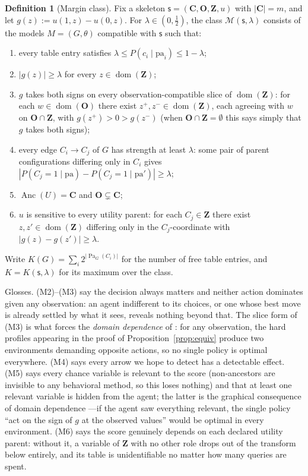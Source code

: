 \documentclass[11pt]{amsart}
\theoremstyle{plain}
\theoremstyle{definition}
\newtheorem{definition}[theorem]{Definition}
\DeclareMathOperator{\Anc}{Anc}
\DeclareMathOperator{\Pa}{Pa}
\DeclareMathOperator{\dom}{dom}
\newcommand{\bC}{\mathbf{C}}
\newcommand{\bO}{\mathbf{O}}
\newcommand{\bZ}{\mathbf{Z}}
\newcommand{\MM}{\mathcal{M}}
\newcommand{\sk}{\mathsf{s}}
\begin{document}
\begin{definition}[Margin class]\label{def:margin}
Fix a skeleton $\sk=(\bC,\bO,\bZ,u)$ with $|\bC|=m$, and let $g(z):=u(1,z)-u(0,z)$. For $\lambda\in(0,\tfrac12)$, the class $\MM(\sk,\lambda)$ consists of the models $M=(G,\theta)$ compatible with $\sk$ such that:
\begin{enumerate}
\item[(M1)] every table entry satisfies $\lambda\le P(c_i\mid\mathrm{pa}_i)\le 1-\lambda$;
\item[(M2)] $|g(z)|\ge\lambda$ for every $z\in\dom(\bZ)$;
\item[(M3)] $g$ takes both signs on every observation-compatible slice of $\dom(\bZ)$: for each $w\in\dom(\bO)$ there exist $z^+,z^-\in\dom(\bZ)$, each agreeing with $w$ on $\bO\cap\bZ$, with $g(z^+)>0>g(z^-)$ (when $\bO\cap\bZ=\emptyset$ this says simply that $g$ takes both signs);
\item[(M4)] every edge $C_i\to C_j$ of $G$ has strength at least $\lambda$: some pair of parent configurations differing only in $C_i$ gives $|P(C_j\!=\!1\mid\mathrm{pa})-P(C_j\!=\!1\mid\mathrm{pa}')|\ge\lambda$;
\item[(M5)] $\Anc(U)=\bC$ and $\bO\subsetneq\bC$;
\item[(M6)] $u$ is sensitive to every utility parent: for each $C_j\in\bZ$ there exist $z,z'\in\dom(\bZ)$ differing only in the $C_j$-coordinate with $|g(z)-g(z')|\ge\lambda$.
\end{enumerate}
Write $K(G)=\sum_i 2^{|\Pa_G(C_i)|}$ for the number of free table entries, and $K=K(\sk,\lambda)$ for its maximum over the class.
\end{definition}

Glosses. (M2)--(M3) say the decision always matters and neither action dominates given any observation: an agent indifferent to its choices, or one whose best move is already settled by what it sees, reveals nothing beyond that. The slice form of (M3) is what forces the \emph{domain dependence} of \cite{richens2024}: for any observation, the hard profiles appearing in the proof of Proposition~\ref{prop:equiv} produce two environments demanding opposite actions, so no single policy is optimal everywhere. (M4) says every arrow we hope to detect has a detectable effect. (M5) says every chance variable is relevant to the score (non-ancestors are invisible to any behavioral method, so this loses nothing) and that at least one relevant variable is hidden from the agent; the latter is the graphical consequence of domain dependence \cite[Lem.~1]{richens2024}---if the agent saw everything relevant, the single policy ``act on the sign of $g$ at the observed values'' would be optimal in every environment. (M6) says the score genuinely depends on each declared utility parent: without it, a variable of $\bZ$ with no other role drops out of the transform below entirely, and its table is unidentifiable no matter how many queries are spent.
\end{document}
